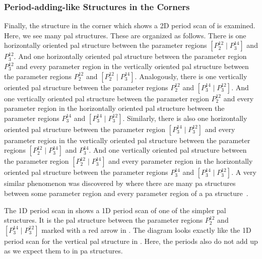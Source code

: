 \subsubsection{Period-adding-like Structures in the Corners}

Finally, the structure in the corner which  shows a 2D period scan of is examined.
Here, we see many \gls{pal} structures.
These are organized as follows.
There is one horizontally oriented \gls{pal} structure between the parameter regions $\left[P^{12}_2 \mid P^{14}_3\right]$ and $P^{12}_3$.
And one horizontally oriented \gls{pal} structure between the parameter region $P^{12}_3$ and every parameter region in the vertically oriented \gls{pal} structure between the parameter regions $P^{12}_2$ and $\left[P^{12}_2 \mid P^{14}_3\right]$.
Analogously, there is one vertically oriented \gls{pal} structure between the parameter regions $P^{12}_2$ and $\left[P^{14}_3 \mid P^{12}_3\right]$.
And one vertically oriented \gls{pal} structure between the parameter region $P^{12}_2$ and every parameter region in the horizontally oriented \gls{pal} structure between the parameter regions $P^{14}_3$ and $\left[P^{14}_3 \mid P^{12}_3\right]$.
Similarly, there is also one horizontally oriented \gls{pal} structure between the parameter region $\left[P^{14}_3 \mid P^{12}_3\right]$ and every parameter region in the vertically oriented \gls{pal} structure between the parameter regions $\left[P^{12}_2 \mid P^{14}_3\right]$ and $P^{14}_3$.
And one vertically oriented \gls{pal} structure between the parameter region $\left[P^{12}_2 \mid P^{14}_3\right]$ and every parameter region in the horizontally oriented \gls{pal} structure between the parameter regions $P^{14}_3$ and $\left[P^{14}_3 \mid P^{12}_3\right]$.
A very similar phenomenon was discovered by  where there are many \gls{pa} structures between some parameter region and every parameter region of a \gls{pa} structure~\cite{tramontana2012period}.

The 1D period scan in  shows a 1D period scan of one of the simpler \gls{pal} structures.
It is the \gls{pal} structure between the parameter regions $P^{12}_2$ and $\left[P^{14}_3 \mid P^{12}_3\right]$ marked with a red arrow in .
The diagram looks exactly like the 1D period scan for the vertical \gls{pal} structure in .
Here, the periods also do not add up as we expect them to in \gls{pa} structures.

